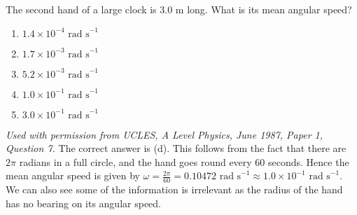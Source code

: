 
\begin{problem}[A1987PIQ7l] 
{The second hand of a large clock is 3.0 m long. What is its mean angular speed?
\begin{enumerate}
	\item $1.4 \times 10^{-4} \textrm{ rad s}^{-1}$
	\item $1.7 \times 10^{-3} \textrm{ rad s}^{-1}$
	\item $5.2 \times 10^{-3} \textrm{ rad s}^{-1}$
	\item $1.0 \times 10^{-1} \textrm{ rad s}^{-1}$ \answer
	\item $3.0 \times 10^{-1} \textrm{ rad s}^{-1}$
\end{enumerate}}
{\textit{Used with permission from UCLES, A Level Physics, June 1987, Paper 1, Question 7.}}
{The correct answer is (d). This follows from the fact that there are $2\pi$ radians in a full circle, and the hand goes round every 60 seconds. Hence the mean angular speed is given by $\omega = \frac{2\pi}{60} = 0.10472 \textrm{ rad s}^{-1} \approx 1.0 \times 10^{-1} \textrm{ rad s}^{-1}$. We can also see some of the information is irrelevant as the radius of the hand has no bearing on its angular speed.}
\end{problem}